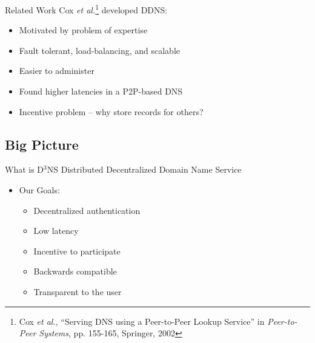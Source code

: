 \documentclass[11pt]{beamer}
\begin{document}
\begin{frame}{Related Work}
	Cox \textit{et al.}\footnote{Cox \textit{et al.}, ``Serving DNS using a Peer-to-Peer Lookup Service'' in \textit{Peer-to-Peer Systems}, pp. 155-165, Springer, 2002 } developed DDNS:
	\begin{itemize}
		\item Motivated by problem of expertise
		\item Fault tolerant, load-balancing, and scalable
		\item Easier to administer
		\item Found higher latencies in a P2P-based DNS
		\item Incentive problem --  why store records for others?
	\end{itemize}
\end{frame}

\subsection{Big Picture}
\begin{frame}{What is D$^3$NS}
	Distributed Decentralized Domain Name Service	
	\begin{itemize}
		\item Our Goals:
		\begin{itemize}
			
			\item Decentralized authentication
			
			\item Low latency
			\item Incentive to participate
			
			\item Backwards compatible
			\item Transparent to the user
		\end{itemize}
	\end{itemize}
	
\end{frame}


\end{document}
